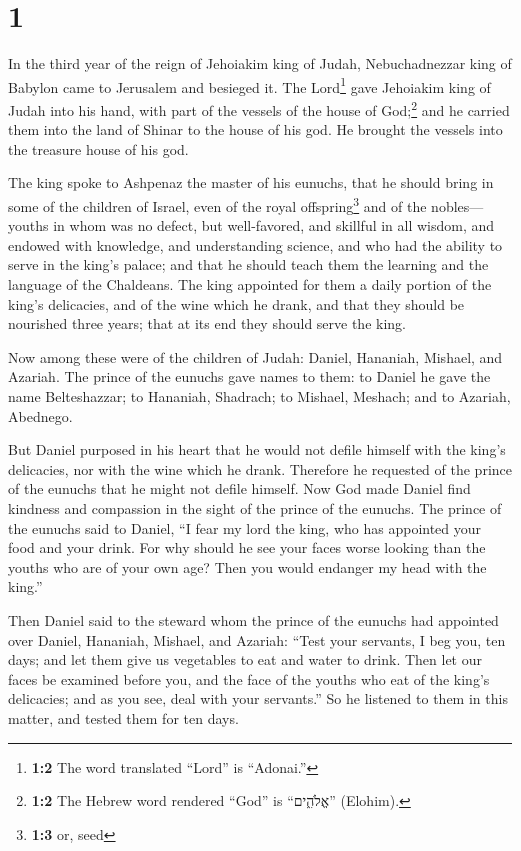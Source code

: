 \hypertarget{section}{%
\section{1}\label{section}}

 In the third year of the reign of Jehoiakim king of
Judah, Nebuchadnezzar king of Babylon came to Jerusalem and besieged it.
 The Lord\footnote{\textbf{1:2} The word translated
  ``Lord'' is ``Adonai.''} gave Jehoiakim king of Judah into his hand,
with part of the vessels of the house of God;\footnote{\textbf{1:2} The
  Hebrew word rendered ``God'' is ``אֱלֹהִ֑ים'' (Elohim).} and he
carried them into the land of Shinar to the house of his god. He brought
the vessels into the treasure house of his god.

 The king spoke to Ashpenaz the master of his eunuchs,
that he should bring in some of the children of Israel, even of the
royal offspring\footnote{\textbf{1:3} or, seed} and of the nobles---
 youths in whom was no defect, but well-favored, and
skillful in all wisdom, and endowed with knowledge, and understanding
science, and who had the ability to serve in the king's palace; and that
he should teach them the learning and the language of the Chaldeans.
 The king appointed for them a daily portion of the king's
delicacies, and of the wine which he drank, and that they should be
nourished three years; that at its end they should serve the king.

 Now among these were of the children of Judah: Daniel,
Hananiah, Mishael, and Azariah.  The prince of the eunuchs
gave names to them: to Daniel he gave the name Belteshazzar; to
Hananiah, Shadrach; to Mishael, Meshach; and to Azariah, Abednego.

 But Daniel purposed in his heart that he would not defile
himself with the king's delicacies, nor with the wine which he drank.
Therefore he requested of the prince of the eunuchs that he might not
defile himself.  Now God made Daniel find kindness and
compassion in the sight of the prince of the eunuchs. 
The prince of the eunuchs said to Daniel, ``I fear my lord the king, who
has appointed your food and your drink. For why should he see your faces
worse looking than the youths who are of your own age? Then you would
endanger my head with the king.''

 Then Daniel said to the steward whom the prince of the
eunuchs had appointed over Daniel, Hananiah, Mishael, and Azariah:
 ``Test your servants, I beg you, ten days; and let them
give us vegetables to eat and water to drink.  Then let
our faces be examined before you, and the face of the youths who eat of
the king's delicacies; and as you see, deal with your servants.''
 So he listened to them in this matter, and tested them
for ten days.

